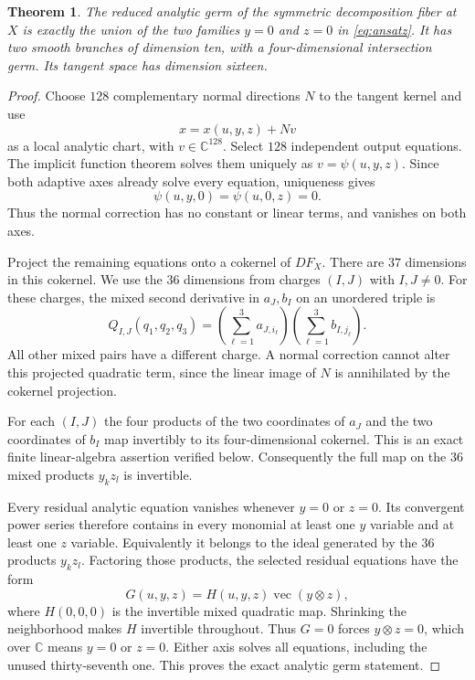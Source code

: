 \documentclass[11pt]{article}
\newtheorem{theorem}{Theorem}[section]
\theoremstyle{definition}\newtheorem{definition}[theorem]{Definition}
\newcommand{\C}{\mathbb C}
\begin{document}
\begin{theorem}\label{thm:two-branches}
The reduced analytic germ of the symmetric decomposition fiber at $X$ is exactly the union of the two families $y=0$ and $z=0$ in \eqref{eq:ansatz}. It has two smooth branches of dimension ten, with a four-dimensional intersection germ. Its tangent space has dimension sixteen.
\end{theorem}
\begin{proof}
Choose $128$ complementary normal directions $N$ to the tangent kernel and use
\[
x=x(u,y,z)+Nv
\]
as a local analytic chart, with $v\in\C^{128}$. Select $128$ independent output equations. The implicit function theorem solves them uniquely as $v=\psi(u,y,z)$. Since both adaptive axes already solve every equation, uniqueness gives
\[
\psi(u,y,0)=\psi(u,0,z)=0.
\]
Thus the normal correction has no constant or linear terms, and vanishes on both axes.

Project the remaining equations onto a cokernel of $DF_X$. There are $37$ dimensions in this cokernel. We use the $36$ dimensions from charges $(I,J)$ with $I,J\ne0$. For these charges, the mixed second derivative in $a_J,b_I$ on an unordered triple is
\begin{equation}\label{eq:mixed}
Q_{I,J}(q_1,q_2,q_3)=
\left(\sum_{\ell=1}^3a_{J,i_\ell}\right)
\left(\sum_{\ell=1}^3b_{I,j_\ell}\right).
\end{equation}
All other mixed pairs have a different charge. A normal correction cannot alter this projected quadratic term, since the linear image of $N$ is annihilated by the cokernel projection.

For each $(I,J)$ the four products of the two coordinates of $a_J$ and the two coordinates of $b_I$ map invertibly to its four-dimensional cokernel. This is an exact finite linear-algebra assertion verified below. Consequently the full map on the $36$ mixed products $y_kz_l$ is invertible.

Every residual analytic equation vanishes whenever $y=0$ or $z=0$. Its convergent power series therefore contains in every monomial at least one $y$ variable and at least one $z$ variable. Equivalently it belongs to the ideal generated by the $36$ products $y_kz_l$. Factoring those products, the selected residual equations have the form
\[
G(u,y,z)=H(u,y,z)\operatorname{vec}(y\otimes z),
\]
where $H(0,0,0)$ is the invertible mixed quadratic map. Shrinking the neighborhood makes $H$ invertible throughout. Thus $G=0$ forces $y\otimes z=0$, which over $\C$ means $y=0$ or $z=0$. Either axis solves all equations, including the unused thirty-seventh one. This proves the exact analytic germ statement.
\end{proof}
\end{document}

